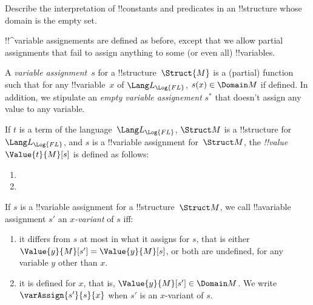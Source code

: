 \documentclass[../../../include/open-logic-section]{subfiles}
\begin{document}
\begin{prob}
Describe the interpretation of !!{constant}s and predicates in 
an !!{structure} whose domain is the empty set.
\end{prob}

!!^{variable} assignements are defined as before, except that we allow
partial assignments that fail to assign anything to some (or even all)
!!{variable}s. 

\begin{defn}
A \emph{variable assignment}~$s$ for a !!{structure}~$\Struct{M}$ is a
(partial) function such that for any !!{variable}~$x$ of
$\Lang L_{\Log{FL}}$, $s(x) \in \Domain M$ if defined. In addition, we stipulate
an \emph{empty variable assignement} $s^{*}$ that doesn't assign any value to
any variable.
\end{defn}

\begin{defn}
If $t$ is a term of the language~$\Lang L_{\Log{FL}}$, $\Struct M$ is a
!!{structure} for~$\Lang L_{\Log{FL}}$, and $s$ is a !!{variable} assignment
for~$\Struct M$, the \emph{!!{value}}~$\Value{t}{M}[s]$ is defined as
follows:
\begin{enumerate}
\item {}
\item {}
\end{enumerate}
\end{defn}

\begin{defn}[$x$-Variant]
If $s$ is a !!{variable} assignment for a !!{structure}~$\Struct M$, we
call !!a{variable} assignment $s'$ an \emph{$x$-variant} of $s$ iff:
\begin{enumerate}
\item it differs from $s$ at most in what it assigns for $s$, that is 
either $\Value{y}{M}[s'] = \Value{y}{M}[s]$, or both are undefined, for
any variable $y$ other than $x$.
\item it is defined for $x$, that is, $\Value{y}{M}[s'] \in \Domain M$.
We write $\varAssign{s'}{s}{x}$ when $s'$ is an $x$-variant of $s$.
\end{enumerate}
\end{defn}
\end{document}
